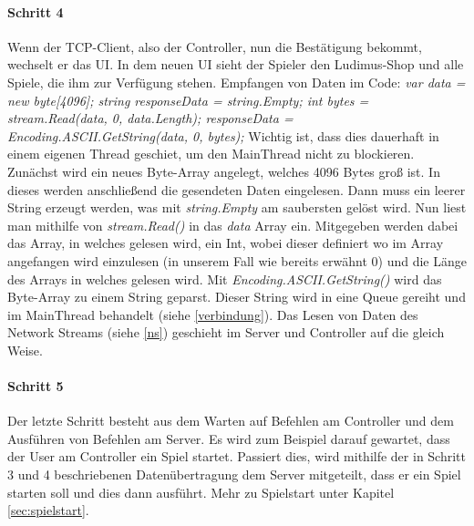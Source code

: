 \paragraph{Schritt 4}
Wenn der TCP-Client, also der Controller, nun die Bestätigung bekommt, wechselt er das UI. In dem neuen UI sieht der Spieler den Ludimus-Shop und alle Spiele, die ihm zur Verfügung stehen.
Empfangen von Daten im Code: \newline
\textit{ 
var data = new byte[4096];\newline
string responseData = string.Empty;\newline
int bytes = stream.Read(data, 0, data.Length); \newline
responseData = Encoding.ASCII.GetString(data, 0, bytes); \newline}
Wichtig ist, dass dies dauerhaft in einem eigenen Thread geschiet, um den MainThread nicht zu blockieren.
Zunächst wird ein neues Byte-Array angelegt, welches 4096 Bytes groß ist. In dieses werden anschließend die gesendeten Daten eingelesen.
Dann muss ein leerer String erzeugt werden, was mit \textit{string.Empty} am saubersten gelöst wird. 
Nun liest man mithilfe von \textit{stream.Read()} in das \textit{data} Array ein. 
Mitgegeben werden dabei das Array, in welches gelesen wird, ein Int, wobei dieser definiert wo im Array angefangen wird einzulesen (in unserem Fall wie bereits erwähnt 0) und die Länge des Arrays in welches gelesen wird.
Mit \textit{Encoding.ASCII.GetString()} wird das Byte-Array zu einem String geparst. 
Dieser String wird in eine Queue gereiht und im MainThread behandelt (siehe \ref{verbindung}). 
Das Lesen von Daten des Network Streams (siehe \ref{ns}) geschieht im Server und Controller auf die gleich Weise.
\paragraph{Schritt 5}
Der letzte Schritt besteht aus dem Warten auf Befehlen am Controller und dem Ausführen von Befehlen am Server.
Es wird zum Beispiel darauf gewartet, dass der User am Controller ein Spiel startet.
Passiert dies, wird mithilfe der in Schritt 3 und 4 beschriebenen Datenübertragung dem Server mitgeteilt, dass er ein Spiel starten soll und dies dann ausführt.
Mehr zu Spielstart unter Kapitel \ref{sec:spielstart}.
